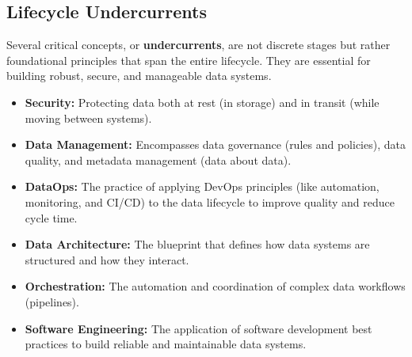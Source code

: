 \documentclass{article}
\begin{document}
\subsection{Lifecycle Undercurrents}
Several critical concepts, or \textbf{undercurrents}, are not discrete stages but rather foundational principles that span the entire lifecycle. They are essential for building robust, secure, and manageable data systems.
\begin{itemize}
    \item \textbf{Security:} Protecting data both at rest (in storage) and in transit (while moving between systems).
    \item \textbf{Data Management:} Encompasses data governance (rules and policies), data quality, and metadata management (data about data).
    \item \textbf{DataOps:} The practice of applying DevOps principles (like automation, monitoring, and CI/CD) to the data lifecycle to improve quality and reduce cycle time.
    \item \textbf{Data Architecture:} The blueprint that defines how data systems are structured and how they interact.
    \item \textbf{Orchestration:} The automation and coordination of complex data workflows (pipelines).
    \item \textbf{Software Engineering:} The application of software development best practices to build reliable and maintainable data systems.
\end{itemize}
\end{document}
